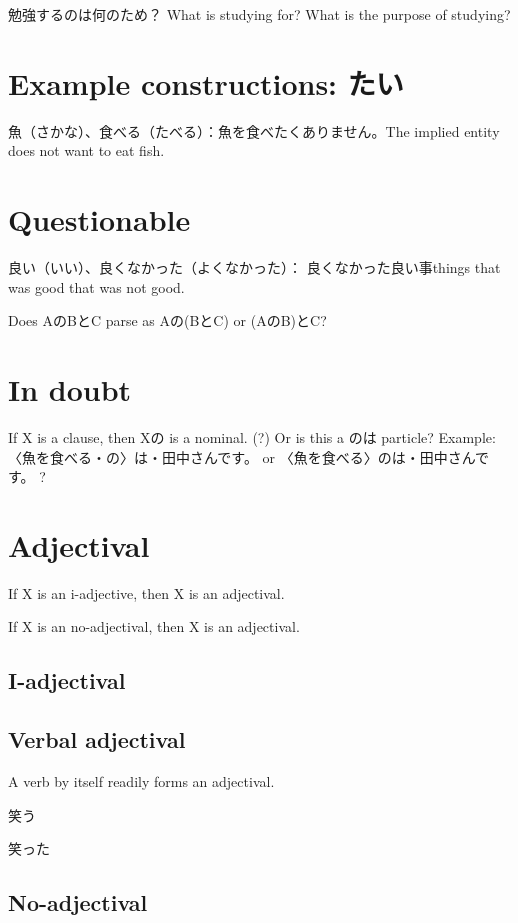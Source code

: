 勉強するのは何のため？
What is studying for?
What is the purpose of studying?

\section{Example constructions: たい}

魚（さかな）、食べる（たべる）：魚を食べたくありません。The implied entity does not want to eat fish.

\section{Questionable}

良い（いい）、良くなかった（よくなかった）：
良くなかった良い事things that was good that was not good.

Does AのBとC parse as Aの(BとC) or (AのB)とC?

\section{In doubt}

If X is a clause, then Xの is a nominal. (?)
Or is this a のは particle?
Example:
〈魚を食べる・の〉は・田中さんです。
or
〈魚を食べる〉のは・田中さんです。
?

\section{Adjectival}

If X is an i-adjective, then X is an adjectival.

If X is an no-adjectival, then X is an adjectival.

\subsection{I-adjectival}

\subsection{Verbal adjectival}

A verb by itself readily forms an adjectival.

笑う

笑った

\subsection{No-adjectival}

